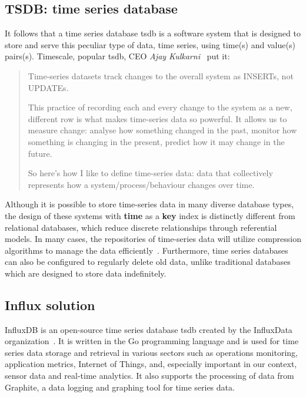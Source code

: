 \subsection{TSDB: time series database}
It follows that a time series database \acs{tsdb} is a software system that is designed to store and serve this peculiar type of data, time series, using time(s) and value(s) pairs(s).
Timescale, popular \ac{tsdb}, CEO \textit{Ajay Kulkarni}~\cite{Misc:asay_why_time_series} put it:
\begin{quote}
    Time-series datasets track changes to the overall system as INSERTs, not UPDATEs.

    This practice of recording each and every change to the system as a new, different row is what makes time-series data so powerful. It allows us to measure change: analyse how something changed in the past, monitor how something is changing in the present, predict how it may change in the future.
    
    So here's how I like to define time-series data: data that collectively represents how a system/process/behaviour changes over time.
\end{quote}
Although it is possible to store time-series data in many diverse database types, the design of these systems with \textbf{time} as a \textbf{key} index is distinctly different from relational databases, which reduce discrete relationships through referential models.
In many cases, the repositories of time-series data will utilize compression algorithms to manage the data efficiently~\cite{Book:devops_cookbook}. Furthermore, time series databases can also be configured to regularly delete old data, unlike traditional databases which are designed to store data indefinitely.

\subsection{Influx solution}
InfluxDB is an open-source time series database \acs{tsdb} created by the InfluxData organization~\cite{Misc:influxdata_website}. It is written in the Go programming language and is used for time series data storage and retrieval in various sectors such as operations monitoring, application metrics, Internet of Things, and, especially important in our context, sensor data and real-time analytics. It also supports the processing of data from Graphite, a data logging and graphing tool for time series data.

